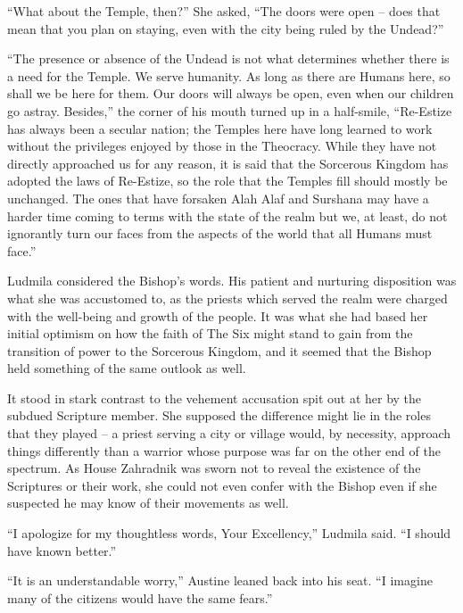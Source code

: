  

“What about the Temple, then?” She asked, “The doors were open – does that mean that you plan on staying, even with the city being ruled by the Undead?”

 

“The presence or absence of the Undead is not what determines whether there is a need for the Temple. We serve humanity. As long as there are Humans here, so shall we be here for them. Our doors will always be open, even when our children go astray. Besides,” the corner of his mouth turned up in a half-smile, “Re-Estize has always been a secular nation; the Temples here have long learned to work without the privileges enjoyed by those in the Theocracy. While they have not directly approached us for any reason, it is said that the Sorcerous Kingdom has adopted the laws of Re-Estize, so the role that the Temples fill should mostly be unchanged. The ones that have forsaken Alah Alaf and Surshana may have a harder time coming to terms with the state of the realm but we, at least, do not ignorantly turn our faces from the aspects of the world that all Humans must face.”

 

Ludmila considered the Bishop’s words. His patient and nurturing disposition was what she was accustomed to, as the priests which served the realm were charged with the well-being and growth of the people. It was what she had based her initial optimism on how the faith of The Six might stand to gain from the transition of power to the Sorcerous Kingdom, and it seemed that the Bishop held something of the same outlook as well.

 

It stood in stark contrast to the vehement accusation spit out at her by the subdued Scripture member. She supposed the difference might lie in the roles that they played – a priest serving a city or village would, by necessity, approach things differently than a warrior whose purpose was far on the other end of the spectrum. As House Zahradnik was sworn not to reveal the existence of the Scriptures or their work, she could not even confer with the Bishop even if she suspected he may know of their movements as well.

 

“I apologize for my thoughtless words, Your Excellency,” Ludmila said. “I should have known better.”

 

“It is an understandable worry,” Austine leaned back into his seat. “I imagine many of the citizens would have the same fears.”

